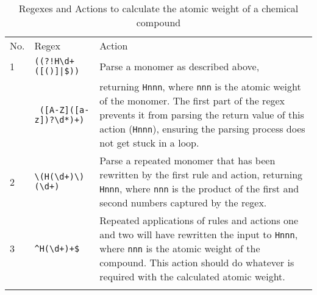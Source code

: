 \newlength{\chemicalactionwidth}
\setlength{\chemicalactionwidth}{\textwidth}
\addtolength{\chemicalactionwidth}{-30pt}
\addtolength{\chemicalactionwidth}{-130pt}
\addtolength{\chemicalactionwidth}{-24pt}

\begin{table}[ht]
    \caption{Regexes and Actions to calculate the atomic weight of a
    chemical compound}
    \empty{}\label{Regexes and Actions to calculate the atomic weight of a
    chemical compound}
    \begin{tabular}{llp{\chemicalactionwidth}}

        \tabletopline{}%
        No.   & Regex                       & Action \\
        \tablemiddleline{}%
        1     & \verb'((?!H\d+([()]|$))'    & Parse a monomer as described above,  \\
              & \verb' ([A-Z]([a-z])?\d*)+)'& returning \verb!Hnnn!, where \verb!nnn! is
                                              the atomic weight of the monomer.  The first
                                              part of the regex prevents it from parsing
                                              the return value of this action
                                              (\verb!Hnnn!), ensuring the parsing process
                                              does not get stuck in a loop.  \\
        2     & \verb!\(H(\d+)\)(\d+)!      & Parse a repeated monomer that has been
                                              rewritten by the first rule and action,
                                              returning \verb!Hnnn!, where \verb!nnn! is
                                              the product of the first and second numbers
                                              captured by the regex.  \\
        3     & \verb!^H(\d+)+$!            & Repeated applications of rules and
                                              actions one and two will have rewritten the
                                              input to \verb!Hnnn!, where \verb!nnn! is
                                              the atomic weight of the compound.  This
                                              action should do whatever is required with
                                              the calculated atomic weight.  \\
        \tablebottomline{}%

    \end{tabular}
\end{table}

